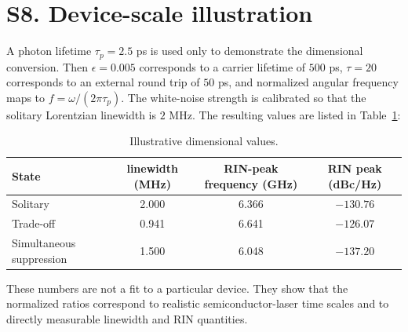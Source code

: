 \documentclass[11pt]{article}
\begin{document}
\section*{S8. Device-scale illustration}

A photon lifetime $\tau_p=2.5$ ps is used only to demonstrate the dimensional conversion. Then $\epsilon=0.005$ corresponds to a carrier lifetime of $500$ ps, $\tau=20$ corresponds to an external round trip of $50$ ps, and normalized angular frequency maps to $f=\omega/(2\pi\tau_p)$. The white-noise strength is calibrated so that the solitary Lorentzian linewidth is $2$ MHz. The resulting values are listed in Table~\ref{tab:dim}:

\begin{table}[h]
\centering
\caption{Illustrative dimensional values.}\label{tab:dim}
\small\setlength{\tabcolsep}{4pt}
\begin{tabular}{lccc}
\toprule
State & linewidth (MHz) & RIN-peak frequency (GHz) & RIN peak (dBc/Hz)\\
\midrule
Solitary & 2.000 & 6.366 & $-130.76$\\
Trade-off & 0.941 & 6.641 & $-126.07$\\
Simultaneous suppression & 1.500 & 6.048 & $-137.20$\\
\bottomrule
\end{tabular}
\end{table}

These numbers are not a fit to a particular device. They show that the normalized ratios correspond to realistic semiconductor-laser time scales and to directly measurable linewidth and RIN quantities.
\end{document}
